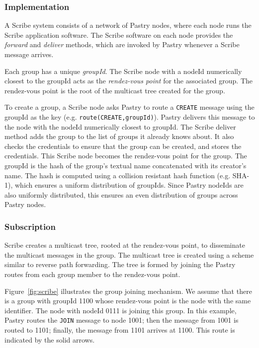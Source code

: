 \documentclass[a4paper,12pt]{article}
\begin{document}
\subsubsection{Implementation}

A Scribe system consists of a network of Pastry nodes, where each node runs the Scribe application software. The Scribe software on each node provides the \textit{forward} and \textit{deliver} methods, which are invoked by Pastry whenever a Scribe message arrives.

Each group has a unique \textit{groupId}. The Scribe node with a nodeId numerically closest to the groupId acts as the \textit{rendez-vous point} for the associated group. The rendez-vous point is the root of the multicast tree created for the group.

To create a group, a Scribe node asks Pastry to route a \texttt{CREATE} message using the groupId as the key (e.g. \texttt{route(CREATE,groupId)}). Pastry delivers this message to the node with the nodeId numerically closest to groupId. The Scribe deliver method adds the group to the list of groups it already knows about. It also checks the credentials to ensure that the group can be created, and stores the credentials. This Scribe node becomes the rendez-vous point for the group.
The groupId is the hash of the group’s textual name concatenated with its creator’s name. The hash is computed using a collision resistant hash function (e.g. SHA-1), which ensures a uniform distribution of groupIds. Since Pastry nodeIds are also uniformly distributed, this ensures an even distribution of groups across Pastry nodes.

\subsubsection{Subscription}

Scribe creates a multicast tree, rooted at the rendez-vous point, to disseminate the multicast messages in the group. The multicast tree is created using a scheme similar to reverse path forwarding. The tree is formed by joining the Pastry routes from each group member to the rendez-vous point.

Figure~\ref{fig:scribe} illustrates the group joining mechanism. We assume that there is a group with groupId 1100 whose rendez-vous point is the node with the same identifier. The node with nodeId 0111 is joining this group. In this example, Pastry routes the \texttt{JOIN} message to node 1001; then the message from 1001 is routed to 1101; finally, the message from 1101 arrives at 1100. This route is indicated by the solid arrows.
\end{document}

